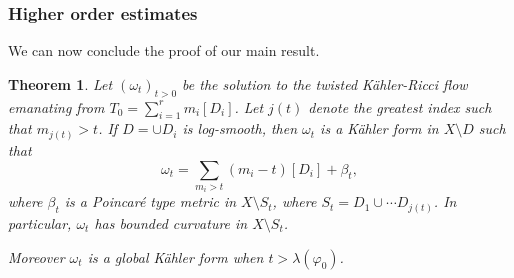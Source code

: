 \documentclass[10pt,a4paper]{amsart}
\numberwithin{equation}{section}
\newtheorem{theorem}{Theorem}[section]
\newcommand{\f}{\varphi}
\newcommand \la {\lambda}
\begin{document}
 
 
 
  \subsubsection{Higher order estimates}
  
  We can now conclude the proof of our main result.
  
  \begin{theorem} \label{thm:main}
  Let $(\omega_t)_{t>0}$ be the solution to the twisted K\"ahler-Ricci flow emanating from $T_0=\sum_{i=1}^r m_i[D_i]$.
Let $j(t)$ denote the greatest index such that $m_{j(t)}>t$.
If $D=\cup D_i$ is log-smooth, then $\omega_t$ is a K\"ahler form in $X \setminus D$ such that
   $$
   \omega_t=\sum_{m_i>t} (m_i-t)  [D_i] + 	\beta_{t},
   $$
   where $\beta_{t}$ is a  Poincar\'e type metric in $X \setminus S_t$,
   where $S_t=D_1 \cup \cdots D_{j(t)}$. In particular, $\omega_t$ has bounded curvature in $X\setminus S_t$. 
   
Moreover $\omega_t$ is a global K\"ahler form when $t > \la(\f_0)$.
  \end{theorem}
\end{document}

